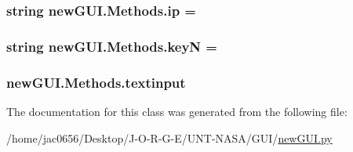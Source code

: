 \subsubsection[{\texorpdfstring{ip}{ip}}]{\setlength{\rightskip}{0pt plus 5cm}string new\+G\+U\+I.\+Methods.\+ip = \textquotesingle{}\textquotesingle{}\hspace{0.3cm}{\ttfamily [static]}}\hypertarget{classnewGUI_1_1Methods_aa72fc8db9e088fd3f8799a11d1a53e46}{}\label{classnewGUI_1_1Methods_aa72fc8db9e088fd3f8799a11d1a53e46}
\subsubsection[{\texorpdfstring{keyN}{keyN}}]{\setlength{\rightskip}{0pt plus 5cm}string new\+G\+U\+I.\+Methods.\+keyN = \textquotesingle{}\textquotesingle{}\hspace{0.3cm}{\ttfamily [static]}}\hypertarget{classnewGUI_1_1Methods_a08570fe44608eec16275255027ae6fb4}{}\label{classnewGUI_1_1Methods_a08570fe44608eec16275255027ae6fb4}
\subsubsection[{\texorpdfstring{textinput}{textinput}}]{\setlength{\rightskip}{0pt plus 5cm}new\+G\+U\+I.\+Methods.\+textinput}\hypertarget{classnewGUI_1_1Methods_a75c7db421f800cd2c2a6e0d686e13c45}{}\label{classnewGUI_1_1Methods_a75c7db421f800cd2c2a6e0d686e13c45}


The documentation for this class was generated from the following file\+:\begin{DoxyCompactItemize}
\item 
/home/jac0656/\+Desktop/\+J-\/\+O-\/\+R-\/\+G-\/\+E/\+U\+N\+T-\/\+N\+A\+S\+A/\+G\+U\+I/\hyperlink{newGUI_8py}{new\+G\+U\+I.\+py}\end{DoxyCompactItemize}

